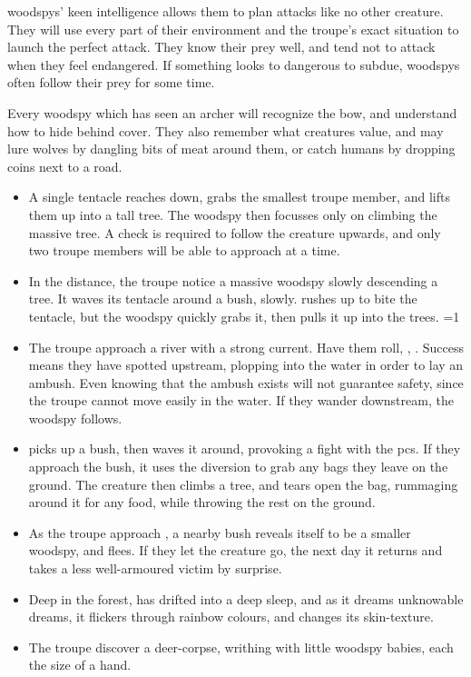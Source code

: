 \begin{multicols}{2}
\showEnc[\E]
\noindent
\Glspl{woodspy}' keen intelligence allows them to plan attacks like no other creature.
They will use every part of their environment and the troupe's exact situation to launch the perfect attack.
They know their prey well, and tend not to attack when they feel endangered.
If something looks to dangerous to subdue, \glspl{woodspy} often follow their prey for some time.

Every \gls{woodspy} which has seen an archer will recognize the bow, and understand how to hide behind cover.
They also remember what creatures value, and may lure wolves by dangling bits of meat around them, or catch humans by dropping coins next to a road.

\begin{itemize}
  \item
  A single tentacle reaches down, grabs the smallest troupe member, and lifts them up into a tall tree.
  The \gls{woodspy} then focusses only on climbing the massive tree.
  A  check is required to follow the creature upwards, and only two troupe members will be able to approach at a time.
  \item
  In the distance, the troupe notice a massive \gls{woodspy} slowly descending a tree.
  It waves its tentacle around a bush, slowly.
   rushes up to bite the tentacle, but the \gls{woodspy} quickly grabs it, then pulls it up into the trees.
  \ifnum\value{temperature}=1
    \item
    The troupe approach a river with a strong current.
    Have them roll, , \tn[9].
    Success means they have spotted  upstream, plopping into the water in order to lay an ambush.
    Even knowing that the ambush exists will not guarantee safety, since the troupe cannot move easily in the water.
    If they wander downstream, the \gls{woodspy} follows.
    \item
     picks up a bush, then waves it around, provoking a fight with the \glspl{pc}.
    If they approach the bush, it uses the diversion to grab any bags they leave on the ground.
    The creature then climbs a tree, and tears open the bag, rummaging around it for any food, while throwing the rest on the ground.
  \else
    \item
    As the troupe approach , a nearby bush reveals itself to be a smaller \gls{woodspy}, and flees.
    If they let the creature go, the next day it returns and takes a less well-armoured victim by surprise.
    \item
    Deep in the forest,  has drifted into a deep sleep, and as it dreams unknowable dreams, it flickers through rainbow colours, and changes its skin-texture.
    \item
    The troupe discover a deer-corpse, writhing with little \gls{woodspy} babies, each the size of a hand.
  \fi
\end{itemize}

\end{multicols}

